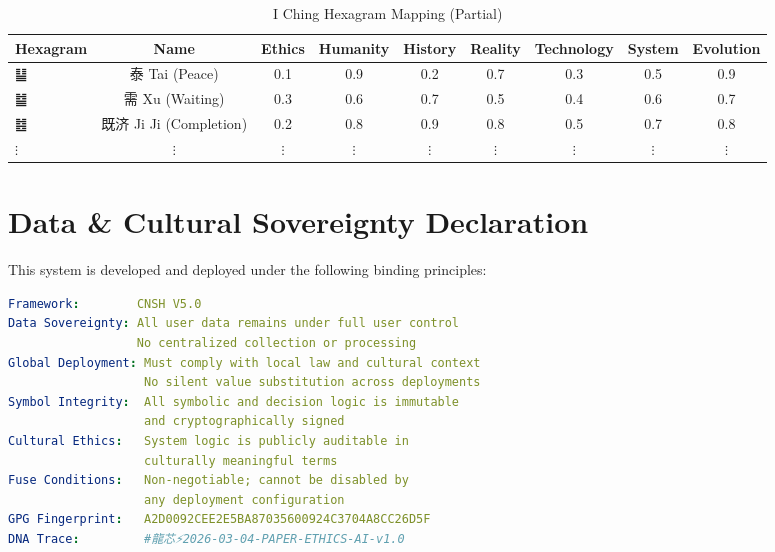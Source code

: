 \documentclass[conference]{IEEEtran}
\begin{document}
\begin{table}[!ht]
\caption{I Ching Hexagram Mapping (Partial)}
\label{tab:hexagram}
\centering
\renewcommand{\arraystretch}{1.1}
\begin{tabular}{lcccccccc}
\toprule
\textbf{Hexagram} & \textbf{Name} & \textbf{Ethics} &
\textbf{Humanity} & \textbf{History} & \textbf{Reality} &
\textbf{Technology} & \textbf{System} & \textbf{Evolution} \\
\midrule
䷊ & 泰 Tai (Peace) & 0.1 & 0.9 & 0.2 & 0.7 & 0.3 & 0.5 & 0.9 \\
䷄ & 需 Xu (Waiting) & 0.3 & 0.6 & 0.7 & 0.5 & 0.4 & 0.6 & 0.7 \\
䷾ & 既济 Ji Ji (Completion) & 0.2 & 0.8 & 0.9 & 0.8 & 0.5 & 0.7 & 0.8 \\
$\vdots$ & $\vdots$ & $\vdots$ & $\vdots$ & $\vdots$ & $\vdots$ & $\vdots$ & $\vdots$ & $\vdots$ \\
\bottomrule
\end{tabular}
\end{table}

\section{Data \& Cultural Sovereignty Declaration}

This system is developed and deployed under the following
binding principles:

\begin{lstlisting}[language=yaml, frame=none]
Framework:        CNSH V5.0
Data Sovereignty: All user data remains under full user control
                  No centralized collection or processing
Global Deployment: Must comply with local law and cultural context
                   No silent value substitution across deployments
Symbol Integrity:  All symbolic and decision logic is immutable
                   and cryptographically signed
Cultural Ethics:   System logic is publicly auditable in
                   culturally meaningful terms
Fuse Conditions:   Non-negotiable; cannot be disabled by
                   any deployment configuration
GPG Fingerprint:   A2D0092CEE2E5BA87035600924C3704A8CC26D5F
DNA Trace:         #龍芯⚡️2026-03-04-PAPER-ETHICS-AI-v1.0
\end{lstlisting}
\end{document}
